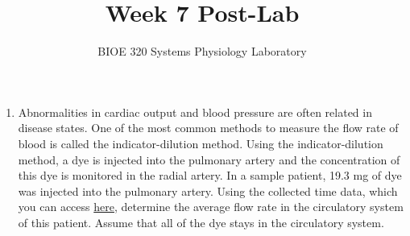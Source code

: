 \documentclass{article}
\title{Week 7 Post-Lab}
\author{BIOE 320 Systems Physiology Laboratory}
\date{}
\begin{document}
\maketitle
\large

\begin{enumerate}
	\item Abnormalities in cardiac output and blood pressure are often related in disease states. One of the most common methods to measure the flow rate of blood is called the indicator-dilution method. Using the indicator-dilution method, a dye is injected into the pulmonary artery and the concentration of this dye is monitored in the radial artery. In a sample patient, 19.3 mg of dye was injected into the pulmonary artery. Using the collected time data, which you can access \href{https://jameslong12.github.io/BIOE320/Assignments.html}{here}, determine the average flow rate in the circulatory system of this patient. Assume that all of the dye stays in the circulatory system.
\end{enumerate}
\end{document}
